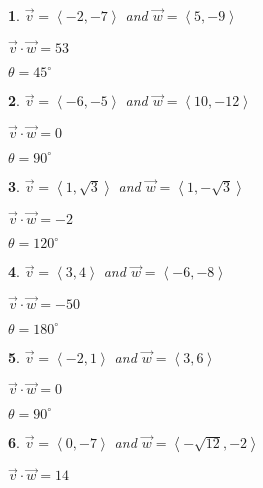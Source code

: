 \documentclass{amsbook}
\newtheorem{exc}{}
\newenvironment{ex}{\begin{exc}\normalfont}{\end{exc}}
\numberwithin{section}{chapter}
\numberwithin{equation}{chapter}
\begin{document}
	\begin{multicols}{2}

\begin{ex}
	$\vec{v} = \left\langle -2, -7 \right\rangle$ and $\vec{w} = \left\langle 5, -9 \right\rangle$ 
	\begin{sol}
		 $\vec{v} \cdot \vec{w} = 53$
		
		$\theta =  45^{\circ}$ 
	\end{sol}
\end{ex}

\begin{ex}
	$\vec{v} = \left\langle -6, -5 \right\rangle$ and $\vec{w} = \left\langle 10, -12 \right\rangle$
	\begin{sol}
		 $\vec{v} \cdot \vec{w} = 0$
		
		$\theta =  90^{\circ}$ 
	\end{sol}
\end{ex}

\begin{ex}
	$\vec{v} = \left\langle 1, \sqrt{3} \right\rangle$ and $\vec{w} = \left\langle 1, -\sqrt{3} \right\rangle$
	\begin{sol}
		
		$\vec{v} \cdot \vec{w} = -2$
		
		$\theta =  120^{\circ}$ 
	\end{sol}
\end{ex}

\begin{ex}
	$\vec{v} = \left\langle  3, 4 \right\rangle$ and $\vec{w} = \left\langle -6, -8 \right\rangle$
	\begin{sol}
		
		$\vec{v} \cdot \vec{w} = -50$
		
		$\theta =  180^{\circ}$ 
	\end{sol}
\end{ex}

\begin{ex}
	$\vec{v} = \left\langle -2,1 \right\rangle$ and $\vec{w} = \left\langle 3,6 \right\rangle$
	\begin{sol}
		$\vec{v} \cdot \vec{w} = 0$
		
		$\theta =  90^{\circ}$ 
	\end{sol}
\end{ex}

\begin{ex}
	$\vec{v} = \left\langle 0,-7 \right\rangle$ and $\vec{w} = \left\langle -\sqrt{12},-2 \right\rangle$
	\begin{sol}
		$\vec{v} \cdot \vec{w} = 14$
		

\end{sol}
\end{ex}
\end{multicols}
\end{document}
